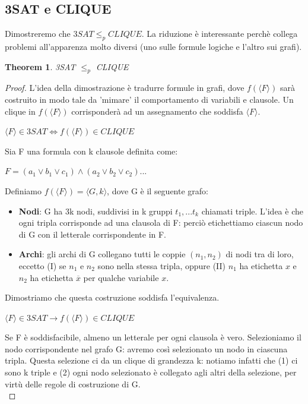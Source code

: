 \documentclass[a4paper, 12pt]{article}
\newtheorem{theorem}{Theorem}[section]
\begin{document}
\subsection{3SAT e CLIQUE}
Dimostreremo che $3SAT \leq_p CLIQUE$. La riduzione \`e interessante perch\`e collega problemi all'apparenza molto diversi (uno sulle formule logiche e l'altro sui grafi).
\begin{theorem}
\label{th:10}
3SAT $\leq_p$ CLIQUE
\end{theorem}
\begin{proof}
L'idea della dimostrazione \`e tradurre formule in grafi, dove $f(\langle F \rangle)$ sar\`a costruito in modo tale da 'mimare' il comportamento di variabili e clausole. Un clique in $f(\langle F \rangle)$ corrisponder\`a ad un assegnamento che soddisfa $\langle F \rangle$.
\begin{center}
$\langle F \rangle \in 3SAT \iff f(\langle F \rangle) \in CLIQUE$
\end{center}
Sia F una formula con k clausole definita come:
\begin{center}
$F = (a_1 \lor b_1 \lor c_1) \land (a_2 \lor b_2 \lor c_2) ...$
\end{center}
Definiamo $f(\langle F \rangle) = \langle G, k \rangle$, dove G \`e il seguente grafo:
\begin{itemize}
\item \textbf{Nodi}: G ha 3k nodi, suddivisi in k gruppi  $t_1,...t_k$ chiamati triple. L'idea \`e che ogni tripla corrisponde ad una clausola di F: perci\`o etichettiamo ciascun nodo di G con il letterale corrispondente in F.
\item \textbf{Archi}: gli archi di G collegano tutti le coppie $(n_1, n_2)$ di nodi tra di loro, eccetto (I) se $n_1$ e $n_2$ sono nella stessa tripla, oppure (II) $n_1$ ha etichetta $x$ e $n_2$ ha etichetta $\overline{x}$ per qualche variabile $x$.
\end{itemize}
Dimostriamo che questa costruzione soddisfa l'equivalenza.
\begin{center}
$\langle F \rangle \in 3SAT \rightarrow f(\langle F \rangle) \in CLIQUE$
\end{center}
Se F \`e soddisfacibile, almeno un letterale per ogni clausola \`e vero. Selezioniamo il nodo corrispondente nel grafo G: avremo cos\`i selezionato un nodo in ciascuna tripla. Questa selezione ci da un clique di grandezza k: notiamo infatti che (1) ci sono k triple e (2) ogni nodo selezionato \`e collegato agli altri della selezione, per virt\`u delle regole di costruzione di G.\\

\end{proof}
\end{document}
